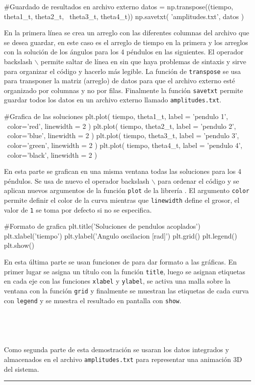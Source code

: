 \begin{listing}[style=python, numbers = none]
#Guardado de resultados en archivo externo
datos = np.transpose((tiempo, theta1_t, theta2_t, \
theta3_t, theta4_t))
np.savetxt( 'amplitudes.txt', datos )
\end{listing}
En la primera línea se crea un arreglo con las diferentes columnas del 
archivo que se desea guardar, en este caso es el arreglo de tiempo en la 
primera y los arreglos con la solución de los ángulos para los 4 péndulos
en las siguientes. El operador backslash $\backslash$ permite saltar de línea 
en \python sin que haya problemas de sintaxis y sirve para organizar el 
código y hacerlo más legible. La función de \numpy \texttt{transpose} se 
usa para transponer la matriz (arreglo) de datos para que el archivo 
externo esté organizado por columnas y no por filas. Finalmente la función
\texttt{savetxt} permite guardar todos los datos en un archivo externo 
llamado \texttt{amplitudes.txt}.


\begin{listing}[style=python, numbers = none]
#Grafica de las soluciones
plt.plot( tiempo, theta1_t, label = 'pendulo 1', \
color='red', linewidth = 2 )
plt.plot( tiempo, theta2_t, label = 'pendulo 2', \
color='blue', linewidth = 2 )
plt.plot( tiempo, theta3_t, label = 'pendulo 3', \
color='green', linewidth = 2 )
plt.plot( tiempo, theta4_t, label = 'pendulo 4', \
color='black', linewidth = 2 )
\end{listing}
En esta parte se grafican en una misma ventana todas las soluciones para 
los 4 péndulos. Se usa de nuevo el operador backslash $\backslash$ para
ordenar el código y se aplican nuevos argumentos de la función 
\texttt{plot} de la librería \matplotlib. El argumento \texttt{color} 
permite definir el color de la curva mientras que \texttt{linewidth}
define el grosor, el valor de \texttt{1} se toma por defecto si no se 
especifica.


\begin{listing}[style=python, numbers = none]
#Formato de grafica
plt.title('Soluciones de pendulos acoplados')
plt.xlabel('tiempo')
plt.ylabel('Angulo oscilacion [rad]')
plt.grid()
plt.legend()
plt.show()
\end{listing}
En esta última parte se usan funciones de \matplotlib para dar formato a 
las gráficas. En primer lugar se asigna un título con la función 
\texttt{title}, luego se asignan etiquetas en cada eje con las funciones 
\texttt{xlabel} y \texttt{ylabel}, se activa una malla sobre la ventana 
con la función \texttt{grid} y finalmente se muestran las etiquetas de 
cada curva con \texttt{legend} y se muestra el resultado en pantalla con
\texttt{show}.

\

\

Como segunda parte de esta demostración se usaran los datos integrados 
y almacenados en el archivo \texttt{amplitudes.txt} para representar una 
animación 3D del sistema.


\rule{14cm}{0.5mm}
